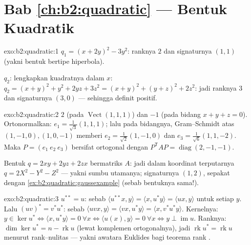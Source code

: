 \section*{Bab \ref{ch:b2:quadratic} --- Bentuk Kuadratik}

\begin{solution}{exo:b2:quadratic:1}
$q_1 = (x + 2y)^2 - 3y^2$: ranknya $2$ dan signaturnya $(1, 1)$ (yakni
bentuk bertipe hiperbola).

$q_2$: lengkapkan kuadratnya dalam $x$: $q_2 = (x + y)^2 + y^2 + 2yz +
3z^2 = (x+y)^2 + (y + z)^2 + 2z^2$: jadi ranknya $3$ dan signaturnya $(3, 0)$
--- sehingga definit positif.
\end{solution}

\begin{solution}{exo:b2:quadratic:2}
 $2$ (pada $\operatorname{Vect}(1,1,1)$) dan $-1$ (pada
bidang $x + y + z = 0$). Ortonormalkan: $e_1 =
\frac{1}{\sqrt3}(1,1,1)$; lalu pada bidangnya, Gram--Schmidt atas $(1,-1,0),
(1,0,-1)$ memberi $e_2 = \frac{1}{\sqrt2}(1,-1,0)$ dan $e_3 =
\frac{1}{\sqrt6}(1,1,-2)$. Maka $P = (e_1\ e_2\ e_3)$ bersifat ortogonal
dengan $P^{\mathsf T}AP = \operatorname{diag}(2,-1,-1)$.

Bentuk $q = 2xy + 2yz + 2zx$ bermatriks $A$: jadi dalam koordinat
terputarnya $q = 2X^2 - Y^2 - Z^2$ --- yakni sumbu utamanya; signaturnya
$(1,2)$, sepakat dengan \cref{ex:b2:quadratic:gaussexample}
(sebab bentuknya sama!).
\end{solution}

\begin{solution}{exo:b2:quadratic:3}
$u^{**} = u$: sebab $\langle u^{**}x, y\rangle = \langle x, u^*y\rangle =
\langle ux, y\rangle$ untuk setiap $y$. Lalu $(uv)^* = v^*u^*$: sebab $\langle
uvx, y\rangle = \langle vx, u^*y\rangle = \langle x,
v^*u^*y\rangle$. Kernelnya: $y \in \ker u^* \iff \langle x, u^*y
\rangle = 0\ \forall x \iff \langle u(x), y\rangle = 0\ \forall x
\iff y \perp \operatorname{im} u$. Ranknya: $\dim\ker u^* = n -
\operatorname{rk} u$ (lewat komplemen ortogonalnya), jadi
$\operatorname{rk} u^* = \operatorname{rk} u$ menurut rank--nulitas ---
yakni awatara Euklides bagi teorema rank .
\end{solution}

